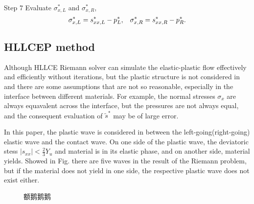 \documentclass{article}
\theoremstyle{plain}\newtheorem{definition}{\sc{Definition}}
\theoremstyle{defination}\newtheorem{example}{Example}[section]
\numberwithin{equation}{section}
\numberwithin{table}{section}
\begin{document}
Step 7 Evaluate $\sigma_{x,L}^*$ and $\sigma_{x,R}^*$,
\begin{equation}
  \sigma_{x,L}^* = s_{xx,L}^* - p_L^*, \hspace{0.3cm} \sigma_{x,R}^* = s_{xx,R}^*- p_R^*.
\end{equation}
\subsection{HLLCEP method}
Although HLLCE Riemann solver can simulate the elastic-plastic flow effectively and efficiently without iterations, but the plastic structure is not considered in and  there are some assumptions that are not so reasonable, especially in the interface between different materials. For example, the normal stresses $\sigma_x$ are  always equavalent across the interface, but the pressures are not always equal, and the consequent evaluation of $\widetilde{s}^*$ may   be of large error. 

In this paper, the plastic wave is considered in between the left-going(right-going) elastic wave and the contact wave. On one side of the plastic wave, the deviatoric stess $|s_{xx}|<\frac{2}{3}Y_u$ and material is in its elastic phase, and on another side, material yields.   Showed in Fig.  there  are five waves in the result of the Riemann problem, but if the material does not yield in one side, the respective  plastic wave does not exist either. 

\begin{figure}
  \centering
\caption{额鹅鹅鹅}
\end{figure}
\end{document}
